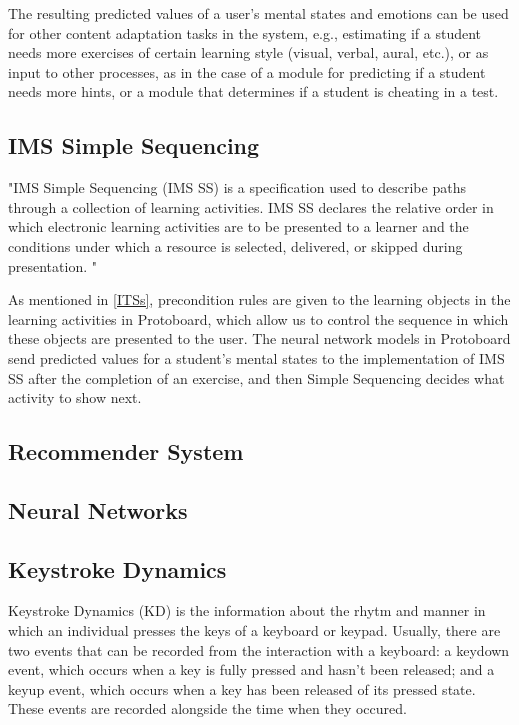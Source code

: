 \documentclass{acm_proc_article-sp}
\begin{document}
The resulting predicted values of a user's mental states and emotions
can be used for other content adaptation tasks in the system, e.g.,
estimating if a student needs more exercises of certain learning style
(visual, verbal, aural, etc.), or as input to other processes, as in
the case of a module for predicting if a student needs more hints, or
a module that determines if a student is cheating in a test.


\subsection{IMS Simple Sequencing}

"IMS Simple Sequencing (IMS SS) is a specification used to describe
paths through a collection of learning activities. IMS SS declares
the relative order in which electronic learning activities are to be
presented to a learner and the conditions under which a resource is
selected, delivered, or skipped during
presentation. \cite{bailey2007ims}"

As mentioned in \ref{ITSs}, precondition rules are given to the
learning objects in the learning activities in Protoboard, which allow
us to control the sequence in which these objects are presented to the
user. The neural network models in Protoboard send predicted values
for a student's mental states to the implementation of IMS SS after the
completion of an exercise, and then Simple Sequencing decides what
activity to show next.


\subsection{Recommender System}

\subsection{Neural Networks}


\subsection{Keystroke Dynamics}
\label{KD}

Keystroke Dynamics (KD) is the information about the rhytm and manner
in which an individual presses the keys of a keyboard or
keypad. Usually, there are two events that can be recorded from the
interaction with a keyboard: a keydown event, which occurs when a key
is fully pressed and hasn't been released; and a keyup event, which
occurs when a key has been released of its pressed state. These events
are recorded alongside the time when they occured.
\end{document}
